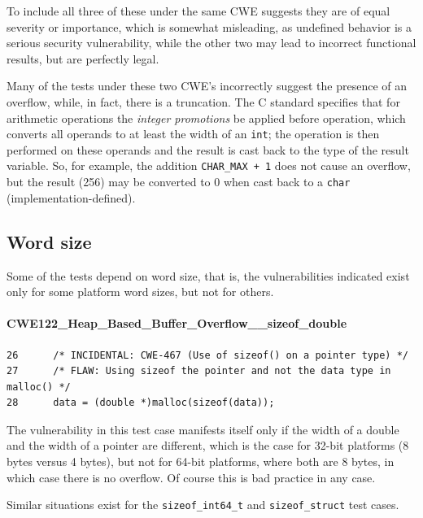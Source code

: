 \documentclass[11pt]{article}
\begin{document}
To include all three of these under the same CWE suggests they are of equal severity or
importance, which is somewhat misleading, as undefined behavior is a serious security
vulnerability, while the other two may lead to incorrect functional results, but are
perfectly legal.

Many of the tests under these two CWE's incorrectly suggest the presence of an overflow,
while, in fact, there is a truncation. The C standard specifies that for arithmetic operations
the \emph{integer promotions} be applied before operation, which converts all operands to at
least the width of an {\tt int}; the operation is then performed on these operands and the result
is cast back to the type of the result variable. So, for example, the addition {\tt CHAR\_MAX + 1}
does not cause an overflow, but the  result (256) may be converted to 0 when cast back to 
a {\tt char} (implementation-defined).


\subsection{Word size}

Some of the tests depend on word size, that is, the vulnerabilities indicated
exist only for some platform word sizes, but not for others.

\paragraph{CWE122\_Heap\_Based\_Buffer\_Overflow\_\_sizeof\_double}
\begin{small}
\begin{verbatim}
26      /* INCIDENTAL: CWE-467 (Use of sizeof() on a pointer type) */
27      /* FLAW: Using sizeof the pointer and not the data type in malloc() */
28      data = (double *)malloc(sizeof(data));
\end{verbatim}
\end{small}
The vulnerability in this test case manifests itself only if the width of a double
and the width of a pointer are different, which is the case for 32-bit platforms
(8 bytes versus 4 bytes), but not for 64-bit platforms, where both are 8 bytes, in
which case there is no overflow. Of course this is bad practice in any case.

Similar situations exist for the {\tt sizeof\_int64\_t} and {\tt sizeof\_struct}
test cases.
\end{document}
